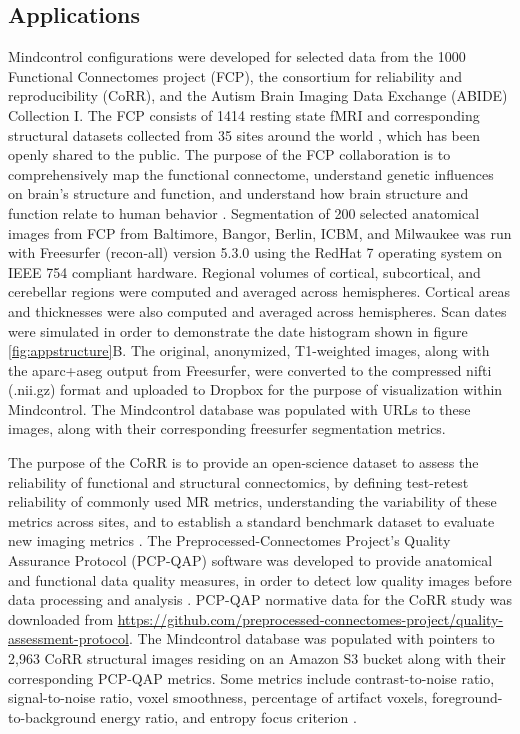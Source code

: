 \subsection{Applications}

Mindcontrol configurations were developed for selected data from the 1000 Functional Connectomes project (FCP), the consortium for reliability and reproducibility (CoRR), and the Autism Brain Imaging Data Exchange (ABIDE) Collection I. The FCP consists of 1414 resting state fMRI and corresponding structural datasets collected from 35 sites around the world  \cite{biswal2010toward}, which has been openly shared to the public. The purpose of the FCP collaboration is to comprehensively map the functional connectome, understand genetic influences on brain's structure and function, and understand how brain structure and function relate to human behavior \cite{biswal2010toward}. Segmentation of 200 selected anatomical images from FCP from Baltimore, Bangor, Berlin, ICBM, and Milwaukee was run with Freesurfer (recon-all) version 5.3.0 \cite{fischl2002whole} using the RedHat 7 operating system on IEEE 754 compliant hardware. Regional volumes of cortical, subcortical, and cerebellar regions were computed and averaged across hemispheres. Cortical areas and thicknesses were also computed and averaged across hemispheres. Scan dates were simulated in order to demonstrate the date histogram shown in figure \ref{fig:appstructure}B. The original, anonymized, T1-weighted images, along with the aparc+aseg output from Freesurfer, were converted to the compressed nifti (.nii.gz) format and uploaded to Dropbox for the purpose of visualization within Mindcontrol. The Mindcontrol database was populated with URLs to these images, along with their corresponding freesurfer segmentation metrics.

The purpose of the CoRR is to provide an open-science dataset to assess the reliability of functional and structural connectomics, by defining test-retest reliability of commonly used MR metrics, understanding the variability of these metrics across sites, and to establish a standard benchmark dataset to evaluate new imaging metrics \cite{Zuo_2014}. The Preprocessed-Connectomes Project's Quality Assurance Protocol (PCP-QAP) software was developed to provide anatomical and functional data quality measures, in order to detect low quality images before data processing and analysis \cite{shehzadpreprocessed}. PCP-QAP normative data for the CoRR study was downloaded from \href{http://raw.githubusercontent.com/preprocessed-connectomes-project/quality-assessment-protocol/master/poster_data/corr_anat.csv}{https://github.com/preprocessed-connectomes-project/quality-assessment-protocol}. The Mindcontrol database was populated with pointers to 2,963 CoRR structural images residing on an Amazon S3 bucket along with their corresponding PCP-QAP metrics. Some metrics include contrast-to-noise ratio, signal-to-noise ratio, voxel smoothness, percentage of artifact voxels, foreground-to-background energy ratio, and entropy focus criterion \cite{shehzadpreprocessed}. 

